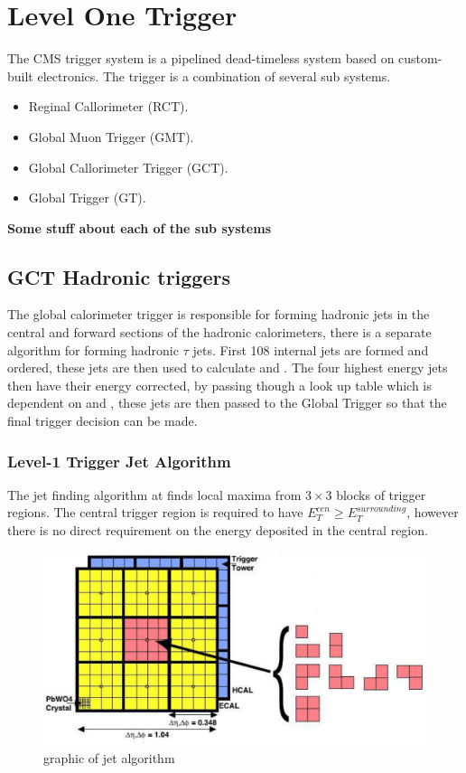\chapter{Level One Trigger} %
\label{cha:level_one_trigger}
The CMS \Lone trigger system\cite{l1} is a pipelined dead-timeless system based on custom-built electronics.
The \Lone trigger is a combination of several sub systems.
\begin{itemize}
  \item Reginal Callorimeter (RCT).
  \item Global Muon Trigger (GMT).
  \item Global Callorimeter Trigger (GCT).
  \item Global Trigger (GT).
\end{itemize}

\textbf{Some stuff about each of the sub systems}

\section{GCT Hadronic triggers} %
\label{sec:gct_hadronic_triggers}
The global calorimeter trigger is responsible for forming hadronic jets in the central and forward sections of the hadronic 
calorimeters, there is a separate algorithm for forming hadronic $\tau$ jets. First 108 internal jets are formed and ordered, these 
jets are then used to calculate \HT and \MHT. The four highest energy jets then have their energy corrected, by passing though a
look up table which is dependent on \ET and \mETA, these jets are then passed to the Global Trigger so that the final trigger
decision can be made.

\subsection{Level-1 Trigger Jet Algorithm} %
\label{sec:Level-1 Trigger Jet Algorythm}
The jet finding algorithm \cite{gctcomm} at \Lone finds local maxima from $3\times3$ blocks
of trigger regions. The central trigger region
is required to have $E_{T}^{cen} \geq E_{T}^{surrounding}$, however there is no direct
requirement on the energy deposited in the central region.

\begin{figure}[htbp]
  \centering
    \includegraphics[width=\textwidth]{generated/LoneTrigger/level1jetalgo.pdf}
  \caption{graphic of \Lone jet algorithm}
  \label{fig:figures_level1jetalgo}
\end{figure}


